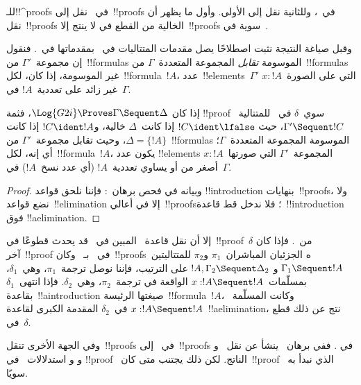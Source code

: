 \documentclass[../../../include/open-logic-section]{subfiles}
\begin{document}


للـ!!^{proof}s في~ نقل إلى~!!{proof}s في~، وللثانية
نقل إلى الأولى. وأول ما يظهر أن نقل~!!{proof}s الخالية من القطع في
 لا ينتج إلا~!!{proof}s سوية في~.

وقبل صياغة النتيجة نثبت اصطلاحًا يصل مقدمات المتتاليات في~
بمقدماتها في~. فنقول إن مجموعة~$\Gamma'$ من~!!{formula}s
الموسومة \emph{تقابل} المجموعة المتعددة~$\Gamma$ من~!!{formula}s غير
الموسومة، إذا كان، لكل~!!{formula}~$!A$، عدد~!!{element}s~$\Gamma'$ التي
على الصورة~$x:!A$ غير زائد على تعددية~$!A$ في~$\Gamma$.

\begin{cor}
إذا كان $\Log{G2i} \Proves \Gamma \Sequent \Delta$، فثمة
!!{proof} سوي~$\delta$ في~ للمتتالية~$\Gamma' \Sequent !C$، حيث
$!C\ident\lfalse$ إذا كانت~$\Delta$ خالية، و$!C\ident !A$ إذا كانت
$\Delta=\{!A\}$، وحيث تقابل مجموعة~$\Gamma'$ من~!!{formula}s الموسومة
المجموعة المتعددة~$\Gamma$؛ أي إنه، لكل~!!{formula}~$!A$، يكون عدد
!!{element}s المجموعة~$\Gamma'$ التي صورتها~$x:!A$ أصغر من أو يساوي
تعددية~$!A$ (أي عدد نسخ~$!A$) في~$\Gamma$.
\end{cor}

\begin{proof}
وبيانه في فحص برهان~: فإننا نلحق قواعد
!!{introduction} بنهايات~!!{proof}s، ولا نضع قواعد~!!{elimination} إلا
في أعالي~!!{proof}s؛ فلا ندخل قط قاعدة~!!{introduction} فوق
!!a{elimination}.
\end{proof}

إلا أن نقل قاعدة~\Cut{} المبين في~
قد يحدث قطوعًا في~!!{proof}~$\delta$ من~. فإذا كان آخر~!!{proof}
في~ بـ~\Cut{} وكان~!!{proof}sه الجزئيان المباشران~$\pi_1$ و$\pi_2$
للمتتاليتين~$\Gamma_1 \Sequent !A$ و
$!A,\Gamma_2 \Sequent \Delta_2$ على الترتيب، فإننا نوصل ترجمة~$\pi_1$،
وهي~$\delta_1$، بمسلّمات~$x:!A \Sequent !A$ الواقعة في ترجمة~$\pi_2$،
وهي~$\delta_2$. فإذا انتهى~$\delta_1$ بقاعدة~!!a{introduction} صيغتها
الرئيسة~!!{formula}~$!A$، وكانت المسلّمة~$x:!A \Sequent !A$ في~$\delta_2$
المقدمة الكبرى لقاعدة~!!a{elimination}، نتج عن ذلك قطع في~$\delta$.

وفي الجهة الأخرى تنقل~!!{proof}s في~ إلى~!!{proof}s في
. ففي برهان~ ينشأ عن نقل~\Elim{\land} و
\Elim{\lif} و\Elim{\lnot} و\Elim{\lforall} استدلالات~\Cut{} في
!!{proof}~ الناتج. لكن ذلك يجتنب متى كان~!!{proof}~
الذي نبدأ به سويًا.
\end{document}
